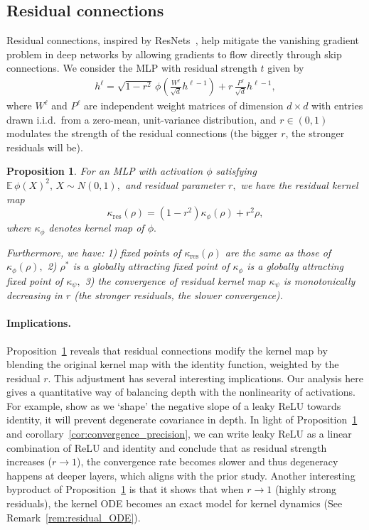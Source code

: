 \documentclass[twoside]{article}
\newcommand{\km}{\kappa_\phi}
\newcommand{\res}{\text{res}}
\newcommand{\E}{\mathbb{E}\,}
\newtheorem{proposition}{Proposition}
\theoremstyle{definition}
\begin{document}
\subsection{Residual connections}

Residual connections, inspired by ResNets~\citep{he2016deep}, help mitigate the vanishing gradient problem in deep networks by allowing gradients to flow directly through skip connections. We consider the MLP with residual strength $t$ given by
\begin{align*}
h^\ell = \sqrt{1-r^2} \, \phi\left( \frac{W^\ell}{\sqrt{d}}  h^{\ell-1} \right) + r\, \frac{P^\ell}{\sqrt{d}}  h^{\ell-1},
\end{align*}
where $W^\ell$ and $P^\ell$ are independent weight matrices of dimension $d \times d$ with entries drawn i.i.d.~from a zero-mean, unit-variance distribution, and $r \in (0, 1)$ modulates the strength of the residual connections (the bigger $r$, the stronger residuals will be).


\begin{proposition}
\label{prop:residual_kernel_map}
For an MLP with activation $\phi$ satisfying $\E\phi(X)^2,\,X\sim N(0,1),$ and residual parameter $r,$ we have the residual kernel map
\begin{equation}
\kappa_\res(\rho) = (1-r^2) \km(\rho) + r^2 \rho,
\end{equation}
where $\km$ denotes kernel map of $\phi.$

Furthermore, we have: 1) fixed points of $\kappa_\res(\rho)$ are the same as those of $\km(\rho),$ 2)  $\rho^*$ is a globally attracting fixed point of  $\km$ is a globally attracting fixed point of $\kappa_\psi,$ 3) the convergence of residual kernel map $\kappa_\psi$ is monotonically decreasing in $r$ (the stronger residuals, the slower convergence). 
\end{proposition}


\paragraph{Implications.} Proposition~\ref{prop:residual_kernel_map} reveals that residual connections modify the kernel map by blending the original kernel map with the identity function, weighted by the residual $r$. This adjustment has several interesting implications. Our analysis here gives a quantitative way of balancing depth with the nonlinearity of activations. For example, \citet{li2022neural} show as we `shape' the negative slope of a leaky ReLU towards identity, it will prevent degenerate covariance in depth. In light of Proposition~\ref{prop:residual_kernel_map} and corollary~\ref{cor:convergence_precision}, we can write leaky ReLU as a linear combination of ReLU and identity and conclude that as residual strength increases ($r\to 1$), the convergence rate becomes slower and thus degeneracy happens at deeper layers, which aligns with the prior study. 
Another interesting byproduct of Proposition~\ref{prop:residual_kernel_map} is that it shows that when $r\to 1$ (highly strong residuals), the kernel ODE becomes an exact model for kernel dynamics (See Remark~\ref{rem:residual_ODE}).
\end{document}
